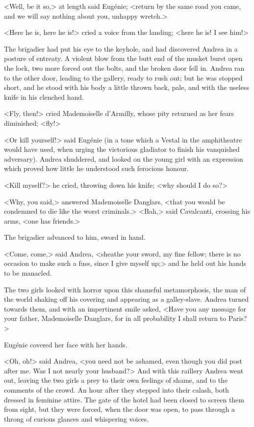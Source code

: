  <Well, be it so,> at length said Eugénie; <return by the same road you came, and we will say nothing about you, unhappy wretch.> 

 <Here he is, here he is!> cried a voice from the landing; <here he is! I see him!> 

 The brigadier had put his eye to the keyhole, and had discovered Andrea in a posture of entreaty. A violent blow from the butt end of the musket burst open the lock, two more forced out the bolts, and the broken door fell in. Andrea ran to the other door, leading to the gallery, ready to rush out; but he was stopped short, and he stood with his body a little thrown back, pale, and with the useless knife in his clenched hand. 

 <Fly, then!> cried Mademoiselle d'Armilly, whose pity returned as her fears diminished; <fly!> 

 <Or kill yourself!> said Eugénie (in a tone which a Vestal in the amphitheatre would have used, when urging the victorious gladiator to finish his vanquished adversary). Andrea shuddered, and looked on the young girl with an expression which proved how little he understood such ferocious honour. 

 <Kill myself?> he cried, throwing down his knife; <why should I do so?> 

 <Why, you said,> answered Mademoiselle Danglars, <that you would be condemned to die like the worst criminals.>  <Bah,> said Cavalcanti, crossing his arms, <one has friends.> 

 The brigadier advanced to him, sword in hand. 

 <Come, come,> said Andrea, <sheathe your sword, my fine fellow; there is no occasion to make such a fuss, since I give myself up;> and he held out his hands to be manacled. 

 The two girls looked with horror upon this shameful metamorphosis, the man of the world shaking off his covering and appearing as a galley-slave. Andrea turned towards them, and with an impertinent smile asked, <Have you any message for your father, Mademoiselle Danglars, for in all probability I shall return to Paris?> 

 Eugénie covered her face with her hands. 

 <Oh, oh!> said Andrea, <you need not be ashamed, even though you did post after me. Was I not nearly your husband?>  And with this raillery Andrea went out, leaving the two girls a prey to their own feelings of shame, and to the comments of the crowd. An hour after they stepped into their calash, both dressed in feminine attire. The gate of the hotel had been closed to screen them from sight, but they were forced, when the door was open, to pass through a throng of curious glances and whispering voices. 

